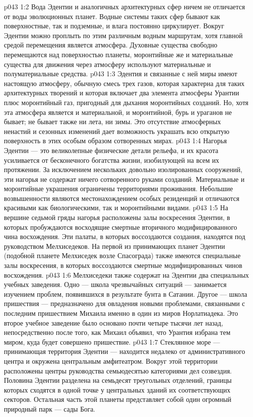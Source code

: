 \vs p043 1:2 Вода Эдентии и аналогичных архитектурных сфер ничем не отличается от воды эволюционных планет. Водные системы таких сфер бывают как поверхностные, так и подземные, и влага постоянно циркулирует. Вокруг Эдентии можно проплыть по этим различным водным маршрутам, хотя главной средой перемещения является атмосфера. Духовные существа свободно перемещаются над поверхностью планеты, моронтийные же и материальные существа для движения через атмосферу используют материальные и полуматериальные средства.
\vs p043 1:3 Эдентия и связанные с ней миры имеют настоящую атмосферу, обычную смесь трех газов, которая характерна для таких архитектурных творений и которая включает два элемента атмосферы Урантии плюс моронтийный газ, пригодный для дыхания моронтийных созданий. Но, хотя эта атмосфера является и материальной, и моронтийной, бурь и ураганов не бывает; не бывает также ни лета, ни зимы. Это отсутствие атмосферных ненастий и сезонных изменений дает возможность украшать всю открытую поверхность в этих особым образом сотворенных мирах.
\vs p043 1:4 Нагорья Эдентии --- это великолепные физические детали рельефа, и их красота усиливается от бесконечного богатства жизни, изобилующей на всем их протяжении. За исключением нескольких довольно изолированных сооружений, эти нагорья не содержат ничего сотворенного руками созданий. Материальные и моронтийные украшения ограничены территориями проживания. Небольшие возвышенности являются местонахождением особых резиденций и отличаются красивыми как биологическими, так и моронтийными видами.
\vs p043 1:5 \pc На вершине седьмой гряды нагорья расположены залы воскресения Эдентии, в которых пробуждаются восходящие смертные вторичного модифицированного чина восхождения. Эти палаты, в которых воссоздаются создания, находятся под руководством Мелхиседеков. На первой из принимающих планет Эдентии (подобной планете Мелхиседек возле Спасограда) также имеются специальные залы воскресения, в которых воссоздаются смертные модифицированных чинов восхождения.
\vs p043 1:6 Мелхиседеки также содержат на Эдентии два специальных учебных заведения. Одно --- школа чрезвычайных ситуаций --- занимается изучением проблем, появившихся в результате бунта в Сатании. Другое --- школа пришествия --- предназначено для овладения новыми проблемами, связанными с последним пришествием Михаила именно в один из миров Норлатиадека. Это второе учебное заведение было основано почти четыре тысячи лет назад, непосредственно после того, как Михаил объявил, что Урантия избрана тем миром, куда будет совершено пришествие.
\vs p043 1:7 \pc Стеклянное море --- принимающая территория Эдентии --- находится недалеко от административного центра и окружена центральным амфитеатром. Вокруг этой территории расположены центры руководства семьюдесятью категориями дел созвездия. Половина Эдентии разделена на семьдесят треугольных отделений, границы которых сходятся в одной точке у центральных зданий их соответствующих секторов. Остальная часть этой планеты представляет собой один огромный природный парк --- сады Бога.
